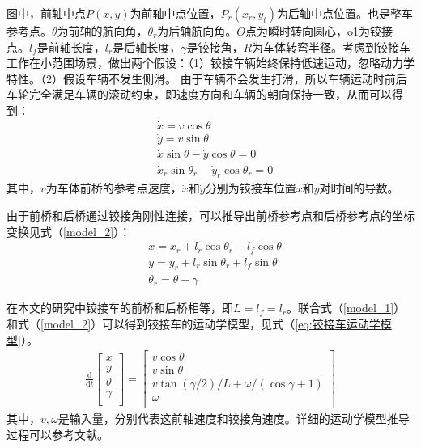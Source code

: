 \documentclass[master,academic]{ysuthesis} %
\begin{document}
	图中，前轴中点$P(x,y)$为前轴中点位置，$P_r(x_r,y_t)$为后轴中点位置。也是整车参考点。$\theta$为前轴的航向角，$\theta_r$为后轴航向角。$O$点为瞬时转向圆心，o1为铰接点。$l_f$是前轴长度，$l_r$是后轴长度，$\gamma$是铰接角，$R$为车体转弯半径。考虑到铰接车工作在小范围场景，做出两个假设：（1）铰接车辆始终保持低速运动，忽略动力学特性。（2）假设车辆不发生侧滑。
	由于车辆不会发生打滑，所以车辆运动时前后车轮完全满足车辆的滚动约束，即速度方向和车辆的朝向保持一致，从而可以得到：
	\begin{equation}
		\begin{aligned}
			&\dot{x}=v\cos\theta\\
			&\dot{y}=v\sin\theta\\
			&\dot{x}\sin\theta-\dot{y}\cos\theta=0\\
			&\dot{x}_r\sin\theta _r-\dot{y}_r\cos\theta _r=0
		\end{aligned}
		\label{model_1}
	\end{equation}
	其中，$v$为车体前桥的参考点速度，$\dot{x}$和$\dot{y}$分别为铰接车位置$x$和$y$对时间的导数。

	由于前桥和后桥通过铰接角刚性连接，可以推导出前桥参考点和后桥参考点的坐标变换见式（\ref{model_2}）：
	\begin{equation}
		\begin{aligned}
			&x=x_r+l_r\cos\theta _r+l_f\cos\theta\\
			&y=y_r+l_r\sin\theta _r+l_f\sin\theta\\
			&\theta _r=\theta-\gamma 
		\end{aligned}
		\label{model_2}
	\end{equation}

	在本文的研究中铰接车的前桥和后桥相等，即$L=l_f=l_r$。联合式（\ref{model_1}）和式（\ref{model_2}）可以得到铰接车的运动学模型，见式（\ref{eq:铰接车运动学模型}）。
	\begin{equation}
		\begin{aligned}
			\frac{\mathrm{d}}{\mathrm{d}t}\left[ \begin{array}{c}
				x\\
				y\\
				\theta\\
				\gamma\\
			\end{array} \right] =\left[ \begin{array}{c}
				v\cos\theta\\
				v\sin\theta\\
				v\tan( \gamma /2 ) /L+\omega /( \cos\gamma +1 )\\
				\omega\\
			\end{array} \right] 
		\end{aligned}
		\label{eq:铰接车运动学模型}
	\end{equation}
	其中，$v,\omega$是输入量，分别代表这前轴速度和铰接角速度。详细的运动学模型推导过程可以参考文献\cite{corke2001steering}。
\end{document}
